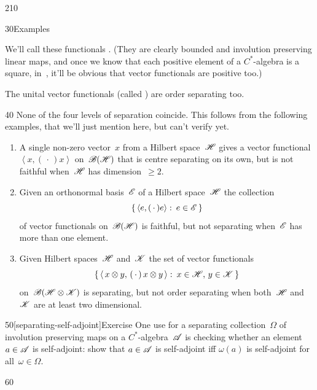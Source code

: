 \begin{parsec}{210}
\begin{point}{30}{Examples}
\begin{enumerate}
We'll call these functionals
%
%
.
(They are clearly bounded
and involution preserving linear maps,
and once we know that each positive element of a $C^*$-algebra
is a square, in~,
it'll be obvious that vector functionals
are positive too.)

The unital vector functionals (called )%
are order separating too.
\end{enumerate}%
\spacingfix%
\begin{point}{40}
None of the four levels of separation
coincide.
This follows from the following examples,
that we'll just mention here,
but can't verify yet.
\begin{enumerate}
\item
A single non-zero vector~$x$ from a Hilbert space~$\mathscr{H}$
gives a vector functional $\left<x,(\,\cdot\,)x\right>$
on~$\mathscr{B}(\mathscr{H})$ that is centre separating
on its own, but is not faithful when~$\mathscr{H}$ has dimension~$\geq 2$.
\item
Given an orthonormal basis~$\mathscr{E}$
of a Hilbert space~$\mathscr{H}$
		the collection 
\begin{equation*}
	\{\,\left<e,(\,\cdot\,)e\right>\colon\,e\in\mathscr{E}\,\}
\end{equation*}
		of vector functionals on~$\mathscr{B}(\mathscr{H})$
		is faithful, but not separating when~$\mathscr{E}$
		has more than one element.
\item
Given Hilbert spaces~$\mathscr{H}$
and~$\mathscr{K}$
the set of vector functionals
\begin{equation*}
	\{\,\left<\,x\otimes y,\,(\,\cdot\,)\,x\otimes y\,\right>\colon\,
x\in\mathscr{H},\,y\in\mathscr{K}\,\}
\end{equation*}
on~$\mathscr{B}(\mathscr{H}\otimes\mathscr{K})$
is separating,
but not order separating
when both~$\mathscr{H}$ and~$\mathscr{K}$
are at least two dimensional.
\end{enumerate}%
\spacingfix{}%
\end{point}%
\end{point}%
\begin{point}{50}[separating-self-adjoint]{Exercise}%
One use for 
a separating collection~$\Omega$
of involution preserving maps
on a $C^*$-algebra~$\mathscr{A}$
is checking whether an element~$a\in\mathscr{A}$
is self-adjoint:
show that $a\in\mathscr{A}$ is self-adjoint
iff $\omega(a)$ is self-adjoint for all~$\omega\in\Omega$.
\end{point}
\begin{point}{60}%

\end{point}
\end{parsec}
